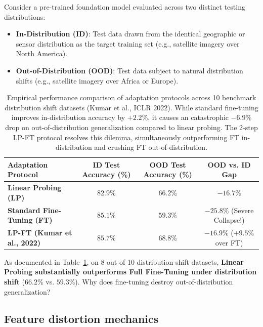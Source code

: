 Consider a pre-trained foundation model evaluated across two distinct testing distributions:
\begin{itemize}[noitemsep,topsep=2pt,parsep=0pt,partopsep=0pt]
  \item \textbf{In-Distribution (ID)}: Test data drawn from the identical geographic or sensor distribution as the target training set (e.g., satellite imagery over North America).
  \item \textbf{Out-of-Distribution (OOD)}: Test data subject to natural distribution shifts (e.g., satellite imagery over Africa or Europe).
\end{itemize}

\begin{table}[H]
\centering
\small
\begin{tabular}{@{}lccc@{}}
\toprule
\textbf{Adaptation Protocol} & \textbf{ID Test Accuracy (\%)} & \textbf{OOD Test Accuracy (\%)} & \textbf{OOD vs. ID Gap} \\ \midrule
\textbf{Linear Probing (LP)} & $82.9\%$ & $\mathbf{66.2\%}$ & $-16.7\%$ \\
\textbf{Standard Fine-Tuning (FT)} & $\mathbf{85.1\%}$ & $59.3\%$ & $\mathbf{-25.8\%}$ (Severe Collapse!) \\ \midrule
\textbf{LP-FT (Kumar et al., 2022)} & $\mathbf{85.7\%}$ & $\mathbf{68.8\%}$ & $\mathbf{-16.9\%}$ ($+9.5\%$ over FT) \\ \bottomrule
\end{tabular}
\caption{Empirical performance comparison of adaptation protocols across 10 benchmark distribution shift datasets (Kumar et al., ICLR 2022). While standard fine-tuning improves in-distribution accuracy by $+2.2\%$, it causes an catastrophic $-6.9\%$ drop on out-of-distribution generalization compared to linear probing. The 2-step LP-FT protocol resolves this dilemma, simultaneously outperforming FT in-distribution and crushing FT out-of-distribution.}
\label{tab:lp_ft_benchmark_comparison}
\end{table}

As documented in Table~\ref{tab:lp_ft_benchmark_comparison}, on 8 out of 10 distribution shift datasets, \textbf{Linear Probing substantially outperforms Full Fine-Tuning under distribution shift} ($66.2\%$ vs. $59.3\%$). Why does fine-tuning destroy out-of-distribution generalization?

\subsection{Feature distortion mechanics}
\label{sec:mechanism_feature_distortion}

